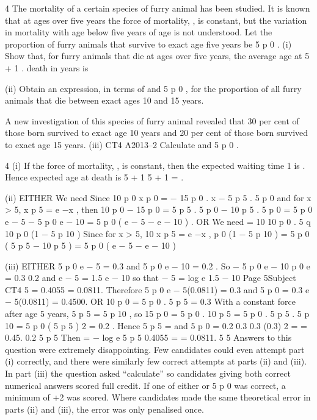 \documentclass[a4paper,12pt]{article}
\begin{document}
4
The mortality of a certain species of furry animal has been studied. It is known that at
ages over five years the force of mortality, \mu, is constant, but the variation in mortality
with age below five years of age is not understood. Let the proportion of furry
animals that survive to exact age five years be 5 p 0 .
(i) Show that, for furry animals that die at ages over five years, the average age at
5 \mu + 1
.
death in years is

\mu
(ii) Obtain an expression, in terms of \mu and 5 p 0 , for the proportion of all furry
animals that die between exact ages 10 and 15 years.

A new investigation of this species of furry animal revealed that 30 per cent of those
born survived to exact age 10 years and 20 per cent of those born survived to exact
age 15 years.
(iii)
CT4 A2013–2
Calculate \mu and
5
p 0 .



4
(i)
If the force of mortality, \mu, is constant, then the expected waiting time
1
is .
\mu
Hence expected age at death is 5 +
1 5 \mu + 1
=
.
\mu
\mu

(ii)
EITHER
We need
Since
10 p 0
x p 0
=
− 15 p 0 .
x − 5 p 5 . 5 p 0
and for x > 5,
x
p 5 = e −\mu x ,
then
10
p 0 − 15 p 0 = 5 p 5 . 5 p 0 − 10 p 5 . 5 p 0 = 5 p 0 e − 5 \mu − 5 p 0 e − 10 \mu = 5 p 0 ( e − 5 \mu − e − 10 \mu ) .
OR
We need
=
10
10
p 0 . 5 q 10
p 0 (1 − 5 p 10 )
Since for x > 5,
10
x
p 5 = e −\mu x ,
p 0 (1 − 5 p 10 ) = 5 p 0 ( 5 p 5 − 10 p 5 ) = 5 p 0 ( e − 5 \mu − e − 10 \mu )

(iii)
EITHER
5
p 0 e − 5 \mu = 0.3 and 5 p 0 e − 10 \mu = 0.2 .
So
− 5  p 0 e
− 10  p 0 e
=
0.3
0.2
and e − 5 \mu = 1.5 e − 10 \mu
so that − 5 \mu = log e 1.5 − 10 \mu
Page 5Subject CT4 %
5 \mu = 0.4055
\mu = 0.0811.
Therefore 5 p 0 e − 5(0.0811) = 0.3
and
5 p 0
=
0.3
e
− 5(0.0811)
= 0.4500.
OR
10
p 0 = 5 p 0 . 5 p 5 = 0.3
With a constant force after age 5 years, 5 p 5 = 5 p 10 ,
so 15 p 0 = 5 p 0 . 10 p 5 = 5 p 0 . 5 p 5 . 5 p 10 = 5 p 0 ( 5 p 5 ) 2 = 0.2 .
Hence 5 p 5 =
and 5 p 0 =
0.2
0.3
0.3 (0.3) 2
=
= 0.45.
0.2
5 p 5
Then \mu = −
log e 5 p 5 0.4055
=
= 0.0811.
5
5
Answers to this question were extremely disappointing. Few candidates could even attempt
part (i) correctly, and there were similarly few correct attempts at parts (ii) and (iii). In part
(iii) the question asked “calculate” so candidates giving both correct numerical answers
scored full credit. If one of either \mu or 5 p 0 was correct, a minimum of +2 was scored. Where
candidates made the same theoretical error in parts (ii) and (iii), the error was only
penalised once.
\end{document}

